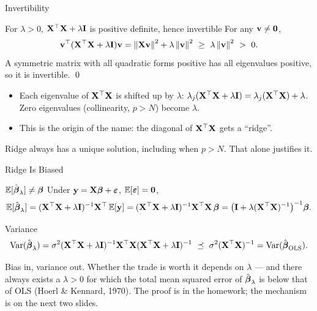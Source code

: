 \documentclass[11pt,aspectratio=169]{beamer}
\begin{document}
\begin{frame}{Invertibility}
\begin{claim}{For $\lambda>0$, $\mathbf{X}^{\top}\mathbf{X}+\lambda\mathbf{I}$ is positive definite, hence invertible}
For any $\mathbf{v}\neq\mathbf{0}$,
\[
\vv\T(\vX\T\vX+\lambda\vI)\vv=\norm{\vX\vv}^2+\lambda\norm{\vv}^2\ \ge\ \lambda\norm\vv^2\ >\ 0 .
\]
A symmetric matrix with all quadratic forms positive has all eigenvalues positive, so it is invertible. \qed
\end{claim}
\vspace{4pt}
\begin{itemize}
  \item Each eigenvalue of $\mathbf{X}^{\top}\mathbf{X}$ is shifted up by $\lambda$: $\lambda_j(\mathbf{X}^{\top}\mathbf{X}+\lambda\mathbf{I})=\lambda_j(\mathbf{X}^{\top}\mathbf{X})+\lambda$.
        Zero eigenvalues (collinearity, $p>N$) become $\lambda$.
  \item This is the origin of the name: the diagonal of $\mathbf{X}^{\top}\mathbf{X}$ gets a ``ridge''.
\end{itemize}
\begin{keypoint}
Ridge always has a unique solution, including when $p>N$. That alone justifies it.
\end{keypoint}
\end{frame}

\begin{frame}{Ridge Is Biased}
\begin{derivation}{$\mathbb{E}[\hat{\boldsymbol{\beta}}_\lambda]\neq\boldsymbol{\beta}$}
Under $\mathbf{y}=\mathbf{X}\boldsymbol{\beta}+\boldsymbol{\varepsilon}$, $\mathbb{E}[\boldsymbol{\varepsilon}]=\mathbf{0}$,
\[
\mathbb{E}[\hat{\boldsymbol{\beta}}_\lambda]=(\mathbf{X}^{\top}\mathbf{X}+\lambda\mathbf{I})^{-1}\mathbf{X}^{\top}\,\mathbb{E}[\mathbf{y}]=(\mathbf{X}^{\top}\mathbf{X}+\lambda\mathbf{I})^{-1}\mathbf{X}^{\top}\mathbf{X}\,\boldsymbol{\beta}
=\bigl(\mathbf{I}+\lambda(\mathbf{X}^{\top}\mathbf{X})^{-1}\bigr)^{-1}\boldsymbol{\beta} .
\]
\end{derivation}
\begin{derivation}{Variance}
\[
\operatorname{Var}(\hat{\boldsymbol{\beta}}_\lambda)=\sigma^2(\mathbf{X}^{\top}\mathbf{X}+\lambda\mathbf{I})^{-1}\mathbf{X}^{\top}\mathbf{X}(\mathbf{X}^{\top}\mathbf{X}+\lambda\mathbf{I})^{-1}
\ \preceq\ \sigma^2(\mathbf{X}^{\top}\mathbf{X})^{-1}=\operatorname{Var}(\hat{\boldsymbol{\beta}}_{\text{OLS}}) .
\]
\end{derivation}
Bias in, variance out. Whether the trade is worth it depends on $\lambda$ --- and there always exists a
$\lambda>0$ for which the total mean squared error of $\hat{\boldsymbol{\beta}}_\lambda$ is below that of OLS
(Hoerl \& Kennard, 1970). The proof is in the homework; the mechanism is on the next two slides.
\end{frame}
\end{document}
